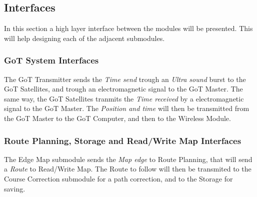 
\subsection{Interfaces}
In this section a high layer interface between the modules will be presented. This will help designing each of the adjacent submodules.

\subsubsection{GoT System Interfaces}
The GoT Transmitter sends the \textit{Time send} trough an \textit{Ultra sound} burst to the GoT Satellites, and trough an electromagnetic signal to the GoT Master. The same way, the GoT Satellites tranmits the \textit{Time received} by a electromagnetic signal to the GoT Master. The \textit{Position and time} will then be transmitted from the GoT Master to the GoT Computer, and then to the Wireless Module.

\subsubsection{Route Planning, Storage and Read/Write Map Interfaces}
The Edge Map submodule sends the \textit{Map edge} to Route Planning, that will send a \textit{Route} to Read/Write Map. The Route to follow will then be transmited to the Course Correction submodule for a path correction, and to the Storage for saving.

